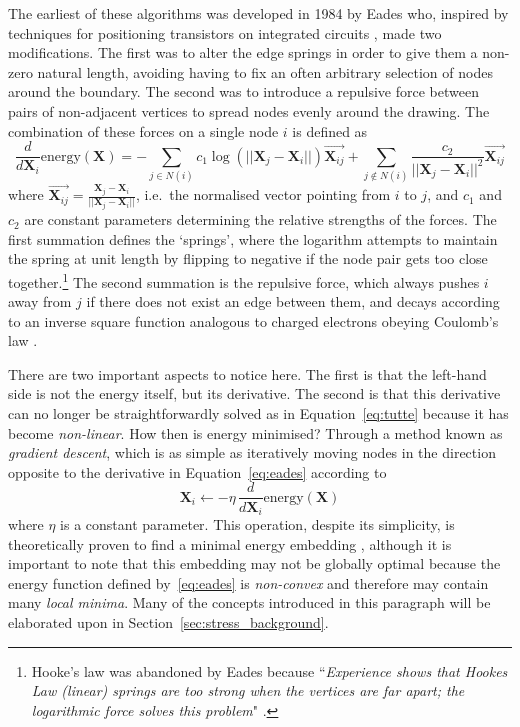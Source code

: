 The earliest of these algorithms was developed in 1984 by Eades \cite{Eades1984} who, inspired by techniques for positioning transistors on integrated circuits \cite{Quinn1979}, made two modifications. The first was to alter the edge springs in order to give them a non-zero natural length, avoiding having to fix an often arbitrary selection of nodes around the boundary. The second was to introduce a repulsive force between pairs of non-adjacent vertices to spread nodes evenly around the drawing.
The combination of these forces on a single node $i$ is defined as
\begin{equation}
  \frac{d}{d\mathbf{X}_i}\mathrm{energy}(\mathbf{X}) = -\sum_{j\in N(i)}c_1\log(||\mathbf{X}_j-\mathbf{X}_i||)\overrightarrow{\mathbf{X}_{ij}}
  + \sum_{j\notin N(i)}\frac{c_2}{||\mathbf{X}_j-\mathbf{X}_i||^2}\overrightarrow{\mathbf{X}_{ij}}
  \label{eq:eades}
\end{equation}
where $\overrightarrow{\mathbf{X}_{ij}} = \frac{\mathbf{X}_j-\mathbf{X}_i}{||\mathbf{X}_j-\mathbf{X}_i||}$, i.e.\ the normalised vector pointing from $i$ to $j$, and $c_1$ and $c_2$ are constant parameters determining the relative strengths of the forces. The first summation defines the `springs', where the logarithm attempts to maintain the spring at unit length by flipping to negative if the node pair gets too close together.\footnote{Hooke's law was abandoned by Eades because ``\emph{Experience shows that Hookes Law (linear) springs are too strong when the vertices are far apart; the logarithmic force solves this problem}" \cite{Eades1984}.}
The second summation is the repulsive force, which always pushes $i$ away from $j$ if there does not exist an edge between them, and decays according to an inverse square function analogous to charged electrons obeying Coulomb's law \cite{Coulomb1785}.

There are two important aspects to notice here. The first is that the left-hand side is not the energy itself, but its derivative. The second is that this derivative can no longer be straightforwardly solved as in Equation~\eqref{eq:tutte} because it has become \emph{non-linear}. How then is energy minimised? Through a method known as \emph{gradient descent}, which is as simple as iteratively moving nodes in the direction opposite to the derivative in Equation~\eqref{eq:eades} according to
\begin{equation}
  \mathbf{X}_i \leftarrow -\eta\, \frac{d}{d\mathbf{X}_i}\mathrm{energy}(\mathbf{X})
\label{eq:gradient_descent}
\end{equation}
where $\eta$ is a constant parameter.
This operation, despite its simplicity, is theoretically proven to find a minimal energy embedding \cite{Cauchy1847}, although it is important to note that this embedding may not be globally optimal because the energy function defined by~\eqref{eq:eades} is \emph{non-convex} and therefore may contain many \emph{local minima}. Many of the concepts introduced in this paragraph will be elaborated upon in Section~\ref{sec:stress_background}.

